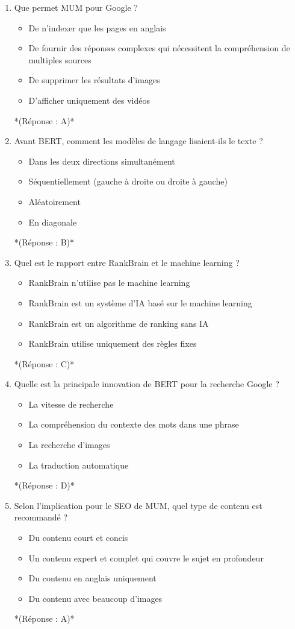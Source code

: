 \documentclass[12pt,a4paper,twoside]{report}
\begin{document}
\begin{enumerate}
\item Que permet MUM pour Google ?
\begin{itemize}
\item[A)] De n'indexer que les pages en anglais
\item[B)] De fournir des réponses complexes qui nécessitent la compréhension de multiples sources
\item[C)] De supprimer les résultats d'images
\item[D)] D'afficher uniquement des vidéos
\end{itemize}
*(Réponse : A)*

\item Avant BERT, comment les modèles de langage lisaient-ils le texte ?
\begin{itemize}
\item[A)] Dans les deux directions simultanément
\item[B)] Séquentiellement (gauche à droite ou droite à gauche)
\item[C)] Aléatoirement
\item[D)] En diagonale
\end{itemize}
*(Réponse : B)*

\item Quel est le rapport entre RankBrain et le machine learning ?
\begin{itemize}
\item[A)] RankBrain n'utilise pas le machine learning
\item[B)] RankBrain est un système d'IA basé sur le machine learning
\item[C)] RankBrain est un algorithme de ranking sans IA
\item[D)] RankBrain utilise uniquement des règles fixes
\end{itemize}
*(Réponse : C)*

\item Quelle est la principale innovation de BERT pour la recherche Google ?
\begin{itemize}
\item[A)] La vitesse de recherche
\item[B)] La compréhension du contexte des mots dans une phrase
\item[C)] La recherche d'images
\item[D)] La traduction automatique
\end{itemize}
*(Réponse : D)*

\item Selon l'implication pour le SEO de MUM, quel type de contenu est recommandé ?
\begin{itemize}
\item[A)] Du contenu court et concis
\item[B)] Un contenu expert et complet qui couvre le sujet en profondeur
\item[C)] Du contenu en anglais uniquement
\item[D)] Du contenu avec beaucoup d'images
\end{itemize}
*(Réponse : A)*


\end{enumerate}
\end{document}
